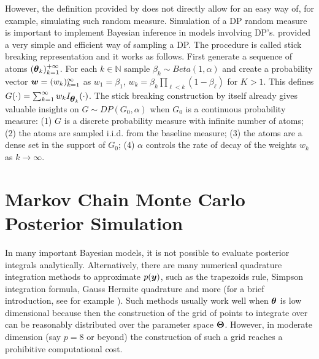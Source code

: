 However, the definition provided by \cite{ferguson1973} does not directly allow for an easy way of, for example, simulating such random measure. Simulation of a DP random measure is important to implement Bayesian inference in models involving DP's. \cite{sethuraman1994} provided a very simple and efficient way of sampling a DP. The procedure is called stick breaking representation and it works as follows. First generate a sequence of atoms $(\mbox{\boldmath $\theta$}_k)^{+\infty}_{k=1}$. For each $k \in \mathbb{N}$ sample $\beta_k \sim Beta(1, \alpha)$ and create a probability vector $\mbox{\boldmath $w$} = (w_k)^{\infty}_{k=1}$ as $w_1 = \beta_1$, $w_k = \beta_k\prod_{\ell < k}(1 - \beta_{\ell})$ for $K>1$. This defines$G(\cdot) = \sum^{\infty}_{k=1}w_k I_{\mbox{\boldmath $\theta$}_k}(\cdot)$. The stick breaking construction by itself already gives valuable insights on $G\sim DP(G_0, \alpha)$ when $G_0$ is a continuous probability measure: (1) $G$ is a discrete probability measure with infinite number of atoms; (2) the atoms are sampled i.i.d. from the baseline measure; (3) the atoms are a dense set in the support of $G_0$; (4) $\alpha$ controls the rate of decay of the weights $w_k$ as $k \rightarrow \infty$.



\section{Markov Chain Monte Carlo Posterior Simulation}

In many important Bayesian models, it is not possible to evaluate posterior integrals analytically. Alternatively, there are many numerical quadrature integration methods to approximate $p(\mbox{\boldmath $y$})$, such as the trapezoids rule, Simpson integration formula, Gauss Hermite quadrature and more (for a brief introduction, see for example \citealt{suli2003}). Such methods usually work well when $\mbox{\boldmath $\theta$}$ is low dimensional because then the construction of the grid of points to integrate over can be reasonably distributed over the parameter space $\mbox{\boldmath $\Theta$}$. However, in moderate dimension (say $p=8$ or beyond) the construction of such a grid reaches a prohibitive computational cost.

